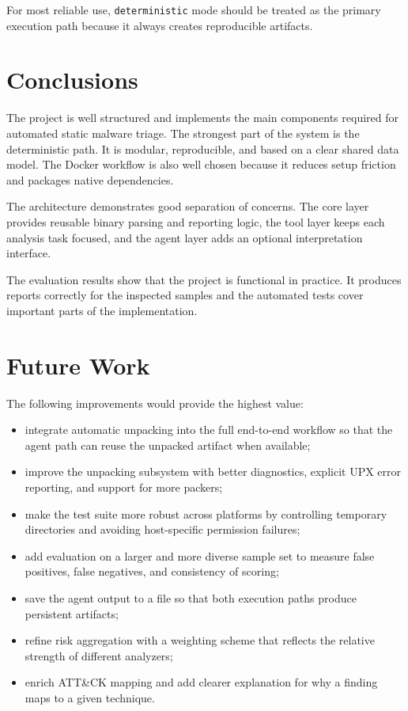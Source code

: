 \documentclass[11pt,a4paper]{article}
\begin{document}
For most reliable use, \texttt{deterministic} mode should be treated as the primary execution path because it always creates reproducible artifacts.

\section{Conclusions}
The project is well structured and implements the main components required for automated static malware triage. The strongest part of the system is the deterministic path. It is modular, reproducible, and based on a clear shared data model. The Docker workflow is also well chosen because it reduces setup friction and packages native dependencies.

The architecture demonstrates good separation of concerns. The core layer provides reusable binary parsing and reporting logic, the tool layer keeps each analysis task focused, and the agent layer adds an optional interpretation interface.

The evaluation results show that the project is functional in practice. It produces reports correctly for the inspected samples and the automated tests cover important parts of the implementation.

\section{Future Work}
The following improvements would provide the highest value:

\begin{itemize}
\item integrate automatic unpacking into the full end-to-end workflow so that the agent path can reuse the unpacked artifact when available;
\item improve the unpacking subsystem with better diagnostics, explicit UPX error reporting, and support for more packers;
\item make the test suite more robust across platforms by controlling temporary directories and avoiding host-specific permission failures;
\item add evaluation on a larger and more diverse sample set to measure false positives, false negatives, and consistency of scoring;
\item save the agent output to a file so that both execution paths produce persistent artifacts;
\item refine risk aggregation with a weighting scheme that reflects the relative strength of different analyzers;
\item enrich ATT\&CK mapping and add clearer explanation for why a finding maps to a given technique.
\end{itemize}
\end{document}
